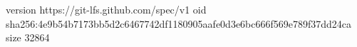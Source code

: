version https://git-lfs.github.com/spec/v1
oid sha256:4e9b54b7173bb5d2c6467742df1180905aafe0d3e6bc666f569e789f37dd24ca
size 32864
